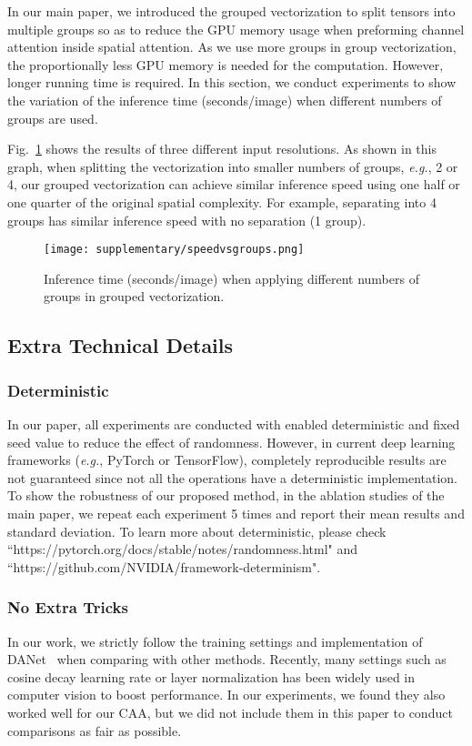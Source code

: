 \documentclass[letterpaper]{article} \usepackage{aaai22}  \usepackage{times}  \usepackage{helvet}  \usepackage{courier}  \usepackage[hyphens]{url}  \usepackage{graphicx} \urlstyle{rm} \def\UrlFont{\rm}  \usepackage{natbib}  \usepackage{caption} \DeclareCaptionStyle{ruled}{labelfont=normalfont,labelsep=colon,strut=off} \frenchspacing  \setlength{\pdfpagewidth}{8.5in}  \setlength{\pdfpageheight}{11in}  \usepackage{algorithm}
\begin{document}
In our main paper, we introduced the grouped vectorization to split tensors into multiple groups so as to reduce the GPU memory usage when preforming channel attention inside spatial attention.
As we use more groups in group vectorization, the proportionally less GPU memory is needed for the computation. 
However, longer running time is required.  
In this section, we conduct experiments to show the variation of the inference time (seconds/image) when different numbers of groups are used. 

Fig.~\ref{figSpeedVSGroups} shows the results of three different input resolutions. 
As shown in this graph, when splitting the vectorization into smaller numbers of groups, \textit{e.g.}, 2 or 4, our grouped vectorization can achieve similar inference speed using one half or one quarter of the original spatial complexity. 
For example, separating into 4 groups has similar inference speed with no separation (1 group).


\begin{figure}[t]
	\centering
	\texttt{[image: supplementary/speedvsgroups.png]}
	\caption{Inference time (seconds/image) when applying different numbers of groups in grouped vectorization.}
\label{figSpeedVSGroups}
\end{figure}

\subsection{Extra Technical Details}

\subsubsection{Deterministic}
In our paper, all experiments are conducted with enabled deterministic and fixed seed value to reduce the effect of randomness. 
However, in current deep learning frameworks (\textit{e.g.}, PyTorch or TensorFlow), completely reproducible results are not guaranteed since not all the operations have a deterministic implementation. 
To show the robustness of our proposed method, in the ablation studies of the main paper, we repeat each experiment 5 times and report their mean results and standard deviation. 
To learn more about deterministic, please check ``https://pytorch.org/docs/stable/notes/randomness.html" and ``https://github.com/NVIDIA/framework-determinism".

\subsubsection{No Extra Tricks}
In our work, we strictly follow the training settings and implementation of DANet~\cite{cDualAttention} when comparing with other methods. 
Recently, many settings such as cosine decay learning rate or layer normalization has been widely used in computer vision to boost performance. 
In our experiments, we found they also worked well for our CAA, but we did not include them in this paper to conduct comparisons as fair as possible.
\end{document}
